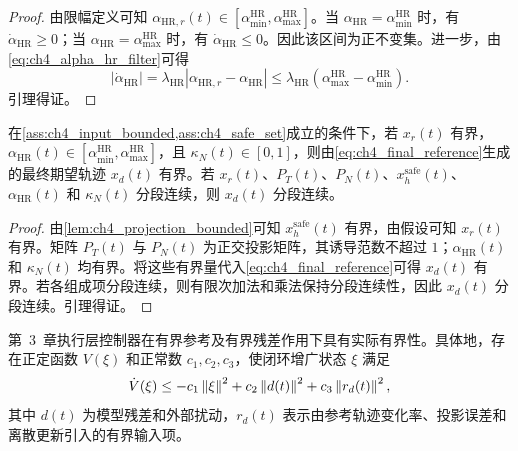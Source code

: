 \begin{proof}
由限幅定义可知 $\alpha_{\mathrm{HR},r}(t)\in[\alpha_{\min}^{\mathrm{HR}},\alpha_{\max}^{\mathrm{HR}}]$。当 $\alpha_{\mathrm{HR}}=\alpha_{\min}^{\mathrm{HR}}$ 时，有 $\dot\alpha_{\mathrm{HR}}\ge0$；当 $\alpha_{\mathrm{HR}}=\alpha_{\max}^{\mathrm{HR}}$ 时，有 $\dot\alpha_{\mathrm{HR}}\le0$。因此该区间为正不变集。进一步，由\eqref{eq:ch4_alpha_hr_filter}可得
\begin{equation}
  |\dot\alpha_{\mathrm{HR}}|
  =
  \lambda_{\mathrm{HR}}
  |\alpha_{\mathrm{HR},r}-\alpha_{\mathrm{HR}}|
  \le
  \lambda_{\mathrm{HR}}
  \left(\alpha_{\max}^{\mathrm{HR}}-\alpha_{\min}^{\mathrm{HR}}\right).
\end{equation}
引理得证。
\end{proof}

\begin{lemma}[最终期望轨迹的有界性]
\label{lem:ch4_reference_bounded}
在\cref{ass:ch4_input_bounded,ass:ch4_safe_set}成立的条件下，若 $x_r(t)$ 有界，$\alpha_{\mathrm{HR}}(t)\in[\alpha_{\min}^{\mathrm{HR}},\alpha_{\max}^{\mathrm{HR}}]$，且 $\kappa_N(t)\in[0,1]$，则由\eqref{eq:ch4_final_reference}生成的最终期望轨迹 $x_d(t)$ 有界。若 $x_r(t)$、$P_T(t)$、$P_N(t)$、$x_h^{\mathrm{safe}}(t)$、$\alpha_{\mathrm{HR}}(t)$ 和 $\kappa_N(t)$ 分段连续，则 $x_d(t)$ 分段连续。
\end{lemma}

\begin{proof}
由\cref{lem:ch4_projection_bounded}可知 $x_h^{\mathrm{safe}}(t)$ 有界，由假设可知 $x_r(t)$ 有界。矩阵 $P_T(t)$ 与 $P_N(t)$ 为正交投影矩阵，其诱导范数不超过 $1$；$\alpha_{\mathrm{HR}}(t)$ 和 $\kappa_N(t)$ 均有界。将这些有界量代入\eqref{eq:ch4_final_reference}可得 $x_d(t)$ 有界。若各组成项分段连续，则有限次加法和乘法保持分段连续性，因此 $x_d(t)$ 分段连续。引理得证。
\end{proof}

\begin{assumption}[执行层对有界参考的实际有界性]
\label{ass:ch4_execution_practical}
第~3~章执行层控制器在有界参考及有界残差作用下具有实际有界性。具体地，存在正定函数 $V(\xi)$ 和正常数 $c_1,c_2,c_3$，使闭环增广状态 $\xi$ 满足
\begin{equation}
  \dot V(\xi)\le
  -c_1\left\lVert \xi\right\rVert^2
  +c_2\left\lVert d(t)\right\rVert^2
  +c_3\left\lVert r_d(t)\right\rVert^2,
  \label{eq:ch4_execution_iss}
\end{equation}
其中 $d(t)$ 为模型残差和外部扰动，$r_d(t)$ 表示由参考轨迹变化率、投影误差和离散更新引入的有界输入项。
\end{assumption}

